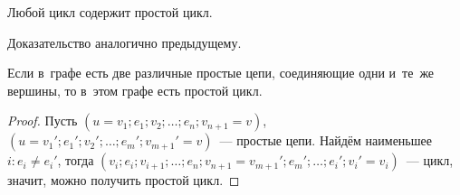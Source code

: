 \begin{lemma}
Любой цикл содержит простой цикл.
\end{lemma}%
Доказательство аналогично предыдущему.
	
\begin{lemma}
\label{lemma:existence_of_simple_cycle}
Если в~графе есть две различные простые цепи, соединяющие одни и~те~же вершины, то в~этом графе есть простой цикл.
\end{lemma}
\begin{proof}
Пусть $(u = v_1; e_1; v_2; \ldots; e_n; v_{n+1} = v)$, $(u = v_1'; e_1'; v_2'; \ldots; e_m'; v_{m+1}' = v)$~--- простые цепи.
Найдём наименьшее~$i \colon e_i \neq e_i'$, тогда $(v_i; e_i; v_{i+1}; \ldots; e_n; v_{n+1} = v_{m+1}'; e_m'; \ldots; e_i'; v_i' = v_i)$~--- цикл, значит, можно получить простой цикл.
\end{proof}